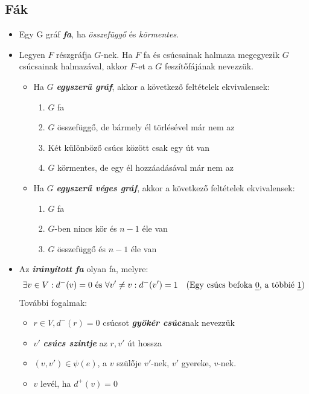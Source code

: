 \documentclass[12pt,margin=0px]{article}
\begin{document}
			
	\subsection*{Fák}
		\begin{itemize}[leftmargin=5.5mm]
        \renewcommand{\labelitemi}{$\vcenter{\hbox{\tiny$\bullet$}}$}
            \item Egy G gráf \emph{\textbf{fa}}, ha \emph{összefüggő} és \emph{körmentes}.
            \item Legyen $F$ részgráfja $G$-nek. Ha $F$ fa és csúcsainak halmaza megegyezik $G$ csúcsainak halmazával, akkor $F$-et a $G$ feszítőfájának nevezzük.
            \begin{itemize}[leftmargin=5.5mm]
                \renewcommand{\labelitemii}{$\vcenter{\hbox{\tiny$\triangleright$}}$}
                    \item Ha $G$ \textbf{\emph{egyszerű gráf}}, akkor a következő feltételek ekvivalensek:
                    \begin{enumerate}
                    \item $G$ fa
                    \item $G$ összefüggő, de bármely él törlésével már nem az
                    \item Két különböző csúcs között csak egy út van
                    \item $G$ körmentes, de egy él hozzáadásával már nem az
                    \end{enumerate}
                \item Ha $G$ \textbf{\emph{egyszerű véges gráf}}, akkor a következő feltételek ekvivalensek:
                \begin{enumerate}
                    \item $G$ fa
                    \item $G$-ben nincs kör és $n-1$ éle van
                    \item $G$ összefüggő és $n-1$ éle van
                \end{enumerate}
            \end{itemize}
            \item Az \emph{\textbf{irányított fa}} olyan fa, melyre:
            \[
                \exists v \in V : d^-(v) = 0 \ \text{és} \ \forall v'\neq v : d^-(v') = 1 \quad \text{(Egy csúcs befoka \emph{0}, a többié \emph{1})}
            \]
            További fogalmak:
            \begin{itemize}[leftmargin=5.5mm]
            \renewcommand{\labelitemii}{$\vcenter{\hbox{\tiny$\triangleright$}}$}
                \item $r \in V, d^-(r) = 0 $ csúcsot \emph{\textbf{gyökér csúcs}}nak nevezzük
                \item $v'$ \textbf{\emph{csúcs szintje}} az $r,v'$ út hossza
                \item $(v,v')\in\psi(e)$, a $v$ szülője $v'$-nek, $v'$ gyereke, $v$-nek.
                \item $v$ levél, ha $d^+(v)=0$
            \end{itemize}
		\end{itemize}
\end{document}
